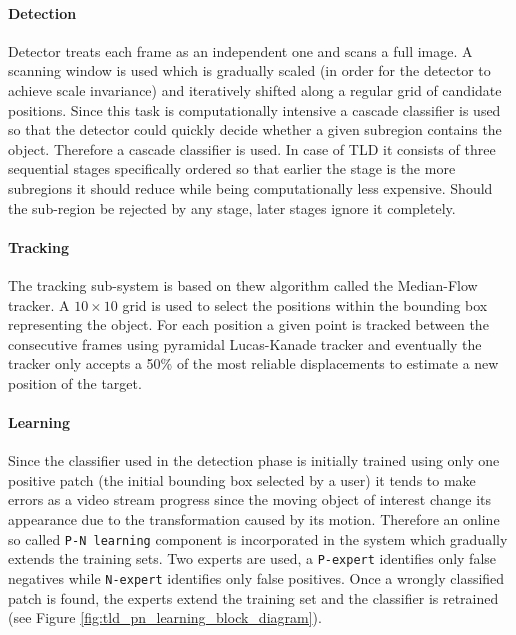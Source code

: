 \paragraph{Detection} Detector treats each frame as an independent one and scans a full image. A scanning window is used which is gradually scaled (in order for the detector to achieve scale invariance) and iteratively shifted along a regular grid of candidate positions. Since this task is computationally intensive a cascade classifier is used so that the detector could quickly decide whether a given subregion contains the object. Therefore a cascade classifier is used. In case of TLD it consists of three sequential stages specifically ordered so that earlier the stage is the more subregions it should reduce while being computationally less expensive. Should the sub-region be rejected by any stage, later stages ignore it completely.

\paragraph{Tracking} The tracking sub-system is based on thew algorithm called the Median-Flow tracker. A $10 \times 10$ grid is used to select the positions within the bounding box representing the object. For each position a given point is tracked between the consecutive frames using pyramidal Lucas-Kanade tracker and eventually the tracker only accepts a 50\% of the most reliable displacements to estimate a new position of the target.

\paragraph{Learning} Since the classifier used in the detection phase is initially trained using only one positive patch (the initial bounding box selected by a user) it tends to make errors as a video stream progress since the moving object of interest change its appearance due to the transformation caused by its motion. Therefore an online so called \texttt{P-N learning} component is incorporated in the system which gradually extends the training sets. Two experts are used, a \texttt{P-expert} identifies only false negatives while \texttt{N-expert} identifies only false positives. Once a wrongly classified patch is found, the experts extend the training set and the classifier is retrained (see Figure \ref{fig:tld_pn_learning_block_diagram}).

